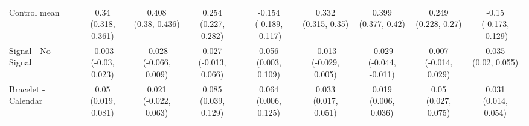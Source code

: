 {\begin{tabular}[t]{lcccccccc}
\midrule
\addlinespace \addlinespace \addlinespace
Control mean & \makecell[c]{0.34\\(0.318, 0.361)} & \makecell[c]{0.408\\(0.38, 0.436)} & \makecell[c]{0.254\\(0.227, 0.282)} & \makecell[c]{-0.154\\(-0.189, -0.117)} & \makecell[c]{0.332\\(0.315, 0.35)} & \makecell[c]{0.399\\(0.377, 0.42)} & \makecell[c]{0.249\\(0.228, 0.27)} & \makecell[c]{-0.15\\(-0.173, -0.129)}\\
\addlinespace \addlinespace \addlinespace
Signal - No Signal & \makecell[c]{-0.003\\(-0.03, 0.023)} & \makecell[c]{-0.028\\(-0.066, 0.009)} & \makecell[c]{0.027\\(-0.013, 0.066)} & \makecell[c]{0.056\\(0.003, 0.109)} & \makecell[c]{-0.013\\(-0.029, 0.005)} & \makecell[c]{-0.029\\(-0.044, -0.011)} & \makecell[c]{0.007\\(-0.014, 0.029)} & \makecell[c]{0.035\\(0.02, 0.055)}\\
\addlinespace \addlinespace \addlinespace
Bracelet - Calendar & \makecell[c]{0.05\\(0.019, 0.081)} & \makecell[c]{0.021\\(-0.022, 0.063)} & \makecell[c]{0.085\\(0.039, 0.129)} & \makecell[c]{0.064\\(0.006, 0.125)} & \makecell[c]{0.033\\(0.017, 0.051)} & \makecell[c]{0.019\\(0.006, 0.036)} & \makecell[c]{0.05\\(0.027, 0.075)} & \makecell[c]{0.031\\(0.014, 0.054)}\\
\bottomrule
\end{tabular}}

